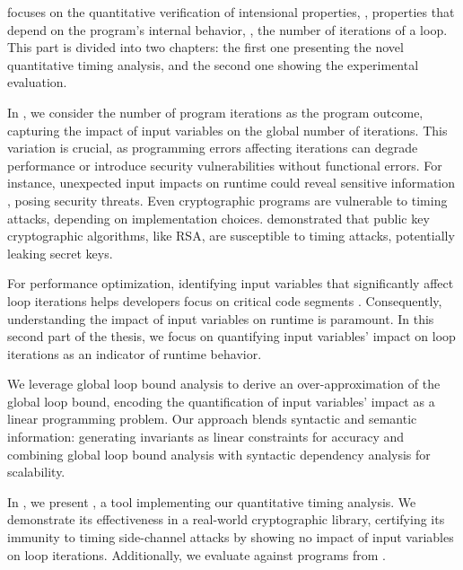  focuses on the quantitative verification of intensional properties, \ie, properties that depend on the program's internal behavior, \eg, the number of iterations of a loop.
This part is divided into two chapters: the first one presenting the novel quantitative timing analysis, and the second one showing the experimental evaluation.

In , we consider the number of program iterations as the program outcome, capturing the impact of input variables on the global number of iterations.
This variation is crucial, as programming errors affecting iterations can degrade performance or introduce security vulnerabilities without functional errors.
For instance, unexpected input impacts on runtime could reveal sensitive information , posing security threats.
Even cryptographic programs are vulnerable to timing attacks, depending on implementation choices.
 demonstrated that public key cryptographic algorithms, like RSA, are susceptible to timing attacks, potentially leaking secret keys.

For performance optimization, identifying input variables that significantly affect loop iterations helps developers focus on critical code segments .
Consequently, understanding the impact of input variables on runtime is paramount.
In this second part of the thesis, we focus on quantifying input variables' impact on loop iterations as an indicator of runtime behavior.

We leverage global loop bound analysis to derive an over-approximation of the global loop bound, encoding the quantification of input variables' impact as a linear programming problem.
Our approach blends syntactic and semantic information: generating invariants as linear constraints for accuracy and combining global loop bound analysis with syntactic dependency analysis  for scalability.

In , we present \timesec\sidenote{\timesecurl}, a tool implementing our quantitative timing analysis.
We demonstrate its effectiveness in a real-world cryptographic library, certifying its immunity to timing side-channel attacks by showing no impact of input variables on loop iterations.
Additionally, we evaluate \timesec{} against programs from \svcomp.


